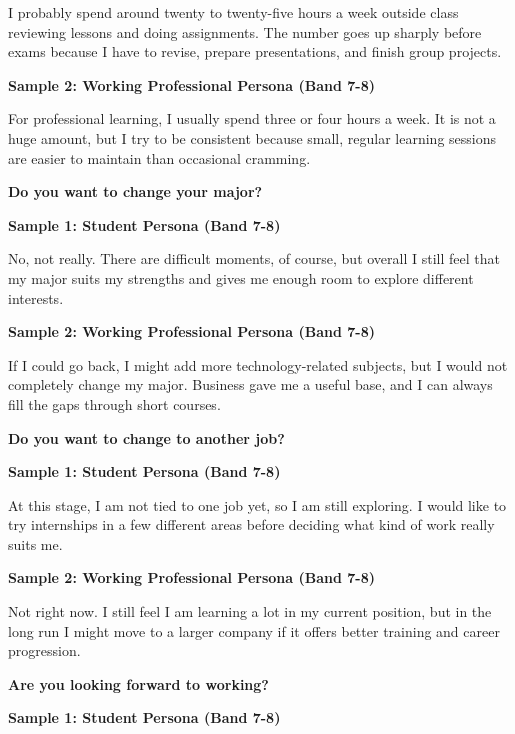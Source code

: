 I probably spend around twenty to twenty-five hours a week outside class reviewing lessons and doing assignments. The number goes up sharply before exams because I have to revise, prepare presentations, and finish group projects.

\textbf{Sample 2: Working Professional Persona (Band 7-8)}

For professional learning, I usually spend three or four hours a week. It is not a huge amount, but I try to be consistent because small, regular learning sessions are easier to maintain than occasional cramming.

\separator

\begin{ieltsquestion}
\textbf{Do you want to change your major?}
\end{ieltsquestion}
\textbf{Sample 1: Student Persona (Band 7-8)}

No, not really. There are difficult moments, of course, but overall I still feel that my major suits my strengths and gives me enough room to explore different interests.

\textbf{Sample 2: Working Professional Persona (Band 7-8)}

If I could go back, I might add more technology-related subjects, but I would not completely change my major. Business gave me a useful base, and I can always fill the gaps through short courses.

\separator

\begin{ieltsquestion}
\textbf{Do you want to change to another job?}
\end{ieltsquestion}
\textbf{Sample 1: Student Persona (Band 7-8)}

At this stage, I am not tied to one job yet, so I am still exploring. I would like to try internships in a few different areas before deciding what kind of work really suits me.

\textbf{Sample 2: Working Professional Persona (Band 7-8)}

Not right now. I still feel I am learning a lot in my current position, but in the long run I might move to a larger company if it offers better training and career progression.

\separator

\begin{ieltsquestion}
\textbf{Are you looking forward to working?}
\end{ieltsquestion}
\textbf{Sample 1: Student Persona (Band 7-8)}

